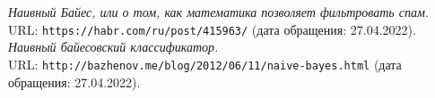 
\begin{thebibliography}{99}
{\itshape Наивный Байес, или о том, как математика позволяет фильтровать спам.} \\URL: \texttt{https://habr.com/ru/post/415963/} (дата обращения: 27.04.2022).
{\itshape Наивный байесовский классификатор.} \\URL: \texttt{http://bazhenov.me/blog/2012/06/11/naive-bayes.html} (дата обращения: 27.04.2022).
\end{thebibliography}
\pagebreak